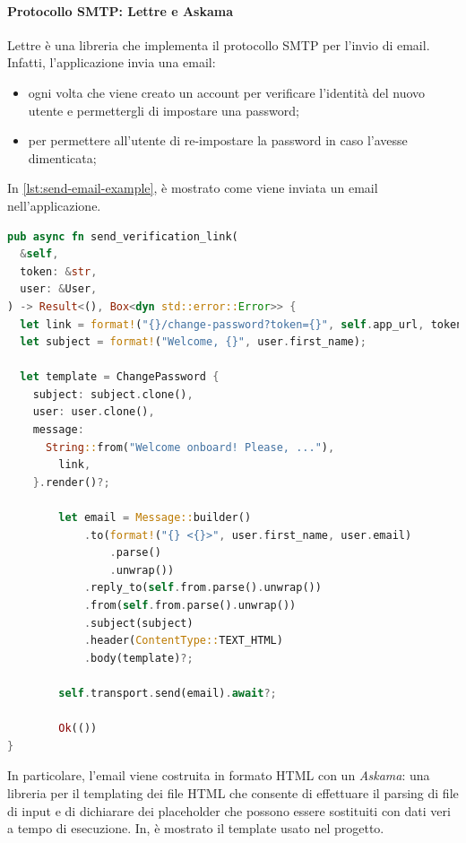 \documentclass{article}
\begin{document}
\paragraph{Protocollo SMTP: Lettre e Askama} Lettre è una libreria che implementa il protocollo SMTP 
per l'invio di email. Infatti, l'applicazione invia una email:
\begin{itemize}
  \item ogni volta che viene creato un account per verificare l'identità del nuovo
    utente e permettergli di impostare una password;
  \item per permettere all'utente di re-impostare la password in caso l'avesse dimenticata;
\end{itemize}

In \cref{lst:send-email-example}, è mostrato come viene inviata un email nell'applicazione. 

\begin{lstlisting}[language=Rust, style=boxed, label={lst:send-email-example}, captionpos=b,caption={Esempio di invio email in Rust con Lettre}]
pub async fn send_verification_link(
  &self,
  token: &str,
  user: &User,
) -> Result<(), Box<dyn std::error::Error>> {
  let link = format!("{}/change-password?token={}", self.app_url, token);
  let subject = format!("Welcome, {}", user.first_name);

  let template = ChangePassword {
    subject: subject.clone(),
    user: user.clone(),
    message:
      String::from("Welcome onboard! Please, ..."),
        link,
    }.render()?;

        let email = Message::builder()
            .to(format!("{} <{}>", user.first_name, user.email)
                .parse()
                .unwrap())
            .reply_to(self.from.parse().unwrap())
            .from(self.from.parse().unwrap())
            .subject(subject)
            .header(ContentType::TEXT_HTML)
            .body(template)?;

        self.transport.send(email).await?;

        Ok(())
}

\end{lstlisting}
In particolare, l'email viene costruita in formato HTML con un \textit{Askama}: una libreria 
per il templating dei file HTML che consente di effettuare il parsing di file di input e di 
dichiarare dei placeholder che possono essere sostituiti con dati veri a tempo di esecuzione.  
In, è mostrato il template usato nel progetto. 
\end{document}
